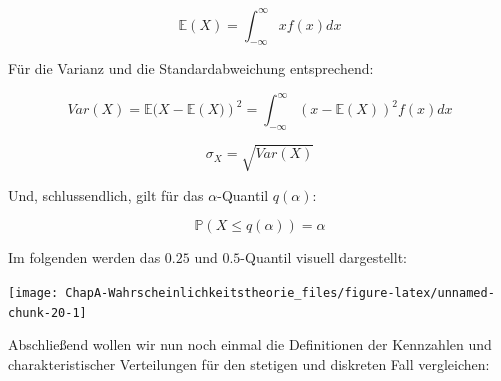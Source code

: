 \documentclass[]{book}
\begin{document}
\[\mathbb{E}(X)=\int_{-\infty}^{\infty}xf(x)dx\]

Für die Varianz und die Standardabweichung entsprechend:

\[Var(X)= \mathbb{E}(X-\mathbb{E}\left(X)\right)^2=\int_{-\infty}^{\infty}(x-\mathbb{E}(X))^2f(x)dx\]

\[\sigma_X=\sqrt{Var(X)}\]

Und, schlussendlich, gilt für das \(\alpha\)-Quantil \(q(\alpha)\):

\[\mathbb{P}(X\leq q(\alpha))=\alpha\]

Im folgenden werden das \(0.25\) und \(0.5\)-Quantil visuell
dargestellt:

\begin{center}\texttt{[image: ChapA-Wahrscheinlichkeitstheorie\_files/figure-latex/unnamed-chunk-20-1]} \end{center}

Abschließend wollen wir nun noch einmal die Definitionen der Kennzahlen
und charakteristischer Verteilungen für den stetigen und diskreten Fall
vergleichen:
\end{document}

